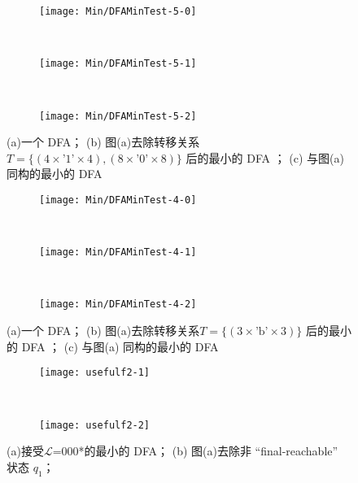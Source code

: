   \begin{figure}[!htbp]
    \centering
    \begin{subfigure}[b]{0.9\textwidth}
        \texttt{[image: Min/DFAMinTest-5-0]}
        \caption{}
        \label{fig:DFAMin-5-0}
    \end{subfigure}
    \\
    \begin{subfigure}[b]{0.9\textwidth}
        \texttt{[image: Min/DFAMinTest-5-1]}
        \caption{}
        \label{fig:DFAMin-5-1}
    \end{subfigure}
    \\
    \begin{subfigure}[b]{0.9\textwidth}
        \texttt{[image: Min/DFAMinTest-5-2]}
        \caption{}
        \label{fig:DFAMin-5-2}
    \end{subfigure}
    \caption{(a)一个 DFA； (b) 图(a)去除转移关系$T=\{(4 \times \mbox{'1'} \times 4),( 8 \times \mbox{'0'} \times 8 )\}$ 后的最小的 DFA ； (c) 与图(a) 同构的最小的 DFA }
    \label{fig:DFAMin-5}
  \end{figure}


  \begin{figure}[!htbp]
    \centering
    \begin{subfigure}[b]{0.7\textwidth}
        \texttt{[image: Min/DFAMinTest-4-0]}
        \caption{}
        \label{fig:DFAMin-4-0}
    \end{subfigure}
    \\
    \begin{subfigure}[b]{0.7\textwidth}
        \texttt{[image: Min/DFAMinTest-4-1]}
        \caption{}
        \label{fig:DFAMin-4-1}
    \end{subfigure}
    \\
    \begin{subfigure}[b]{0.7\textwidth}
        \texttt{[image: Min/DFAMinTest-4-2]}
        \caption{}
        \label{fig:DFAMin-4-2}
    \end{subfigure}
    \caption{(a)一个 DFA； (b) 图(a)去除转移关系$T=\{(3 \times \mbox{'b'} \times 3)\}$ 后的最小的 DFA ； (c) 与图(a) 同构的最小的 DFA }
    \label{fig:DFAMin-4}
  \end{figure}

\begin{figure}[!htbp]
  \centering
  \begin{subfigure}[b]{0.35\textwidth}
      \texttt{[image: usefulf2-1]}
      \caption{}
      \label{fig:usefulf2-1}
  \end{subfigure}
  ~
  \begin{subfigure}[b]{0.35\textwidth}
      \texttt{[image: usefulf2-2]}
      \caption{}
      \label{fig:usefulf2-2}
  \end{subfigure}
  \caption{(a)接受{$\mathcal{L}$}=000*的最小的 DFA；  (b) 图(a)去除非 “final-reachable” 状态 {$q_1$}； }
  \label{fig:usefulf2-0}
\end{figure}




